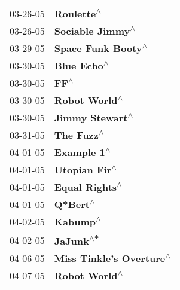 \begin{supertabular}{p{0.25\columnwidth}p{0.75\columnwidth}}
 03-26-05 &                                                                 \textbf{Roulette\textsuperscript{$\wedge$}} \\
 03-26-05 &                                                           \textbf{Sociable Jimmy\textsuperscript{$\wedge$}} \\
 03-29-05 &                                                         \textbf{Space Funk Booty\textsuperscript{$\wedge$}} \\
 03-30-05 &                                                                \textbf{Blue Echo\textsuperscript{$\wedge$}} \\
 03-30-05 &                                                                       \textbf{FF\textsuperscript{$\wedge$}} \\
 03-30-05 &                                                              \textbf{Robot World\textsuperscript{$\wedge$}} \\
 03-30-05 &                                                            \textbf{Jimmy Stewart\textsuperscript{$\wedge$}} \\
 03-31-05 &                                                                 \textbf{The Fuzz\textsuperscript{$\wedge$}} \\
 04-01-05 &                                                                \textbf{Example 1\textsuperscript{$\wedge$}} \\
 04-01-05 &                                                              \textbf{Utopian Fir\textsuperscript{$\wedge$}} \\
 04-01-05 &                                                             \textbf{Equal Rights\textsuperscript{$\wedge$}} \\
 04-01-05 &                                                                   \textbf{Q*Bert\textsuperscript{$\wedge$}} \\
 04-02-05 &                                                                   \textbf{Kabump\textsuperscript{$\wedge$}} \\
 04-02-05 &                                                                  \textbf{JaJunk\textsuperscript{$\wedge$*}} \\
 04-06-05 &                                                   \textbf{Miss Tinkle's Overture\textsuperscript{$\wedge$}} \\
 04-07-05 &                                                              \textbf{Robot World\textsuperscript{$\wedge$}} \\

\end{supertabular}
